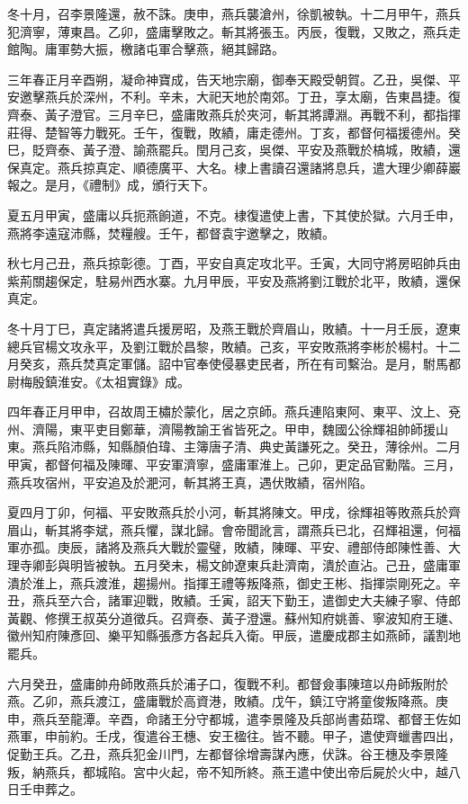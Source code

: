 \begin{pinyinscope}
冬十月，召李景隆還，赦不誅。庚申，燕兵襲滄州，徐凱被執。十二月甲午，燕兵犯濟寧，薄東昌。乙卯，盛庸擊敗之。斬其將張玉。丙辰，復戰，又敗之，燕兵走館陶。庸軍勢大振，檄諸屯軍合擊燕，絕其歸路。

三年春正月辛酉朔，凝命神寶成，告天地宗廟，御奉天殿受朝賀。乙丑，吳傑、平安邀擊燕兵於深州，不利。辛未，大祀天地於南郊。丁丑，享太廟，告東昌捷。復齊泰、黃子澄官。三月辛巳，盛庸敗燕兵於夾河，斬其將譚淵。再戰不利，都指揮莊得、楚智等力戰死。壬午，復戰，敗績，庸走德州。丁亥，都督何福援德州。癸巳，貶齊泰、黃子澄、諭燕罷兵。閏月己亥，吳傑、平安及燕戰於槁城，敗績，還保真定。燕兵掠真定、順德廣平、大名。棣上書讀召還諸將息兵，遣大理少卿薛巖報之。是月，《禮制》成，頒行天下。

夏五月甲寅，盛庸以兵扼燕餉道，不克。棣復遣使上書，下其使於獄。六月壬申，燕將李遠寇沛縣，焚糧艘。壬午，都督袁宇邀擊之，敗績。

秋七月己丑，燕兵掠彰德。丁酉，平安自真定攻北平。壬寅，大同守將房昭帥兵由紫荊關趨保定，駐易州西水寨。九月甲辰，平安及燕將劉江戰於北平，敗績，還保真定。

冬十月丁巳，真定諸將遣兵援房昭，及燕王戰於齊眉山，敗績。十一月壬辰，遼東總兵官楊文攻永平，及劉江戰於昌黎，敗績。己亥，平安敗燕將李彬於楊村。十二月癸亥，燕兵焚真定軍儲。詔中官奉使侵暴吏民者，所在有司繫治。是月，駙馬都尉梅殷鎮淮安。《太祖實錄》成。

四年春正月甲申，召故周王橚於蒙化，居之京師。燕兵連陷東阿、東平、汶上、兗州、濟陽，東平吏目鄭華，濟陽教諭王省皆死之。甲申，魏國公徐輝祖帥師援山東。燕兵陷沛縣，知縣顏伯瑋、主簿唐子清、典史黃謙死之。癸丑，薄徐州。二月甲寅，都督何福及陳暉、平安軍濟寧，盛庸軍淮上。己卯，更定品官勳階。三月，燕兵攻宿州，平安追及於淝河，斬其將王真，遇伏敗績，宿州陷。

夏四月丁卯，何福、平安敗燕兵於小河，斬其將陳文。甲戌，徐輝祖等敗燕兵於齊眉山，斬其將李斌，燕兵懼，謀北歸。會帝聞訛言，謂燕兵已北，召輝祖還，何福軍亦孤。庚辰，諸將及燕兵大戰於靈璧，敗績，陳暉、平安、禮部侍郎陳性善、大理寺卿彭與明皆被執。五月癸未，楊文帥遼東兵赴濟南，潰於直沾。己丑，盛庸軍潰於淮上，燕兵渡淮，趨揚州。指揮王禮等叛降燕，御史王彬、指揮崇剛死之。辛丑，燕兵至六合，諸軍迎戰，敗績。壬寅，詔天下勤王，遣御史大夫練子寧、侍郎黃觀、修撰王叔英分道徵兵。召齊泰、黃子澄還。蘇州知府姚善、寧波知府王璡、徽州知府陳彥回、樂平知縣張彥方各起兵入衛。甲辰，遣慶成郡主如燕師，議割地罷兵。

六月癸丑，盛庸帥舟師敗燕兵於浦子口，復戰不利。都督僉事陳瑄以舟師叛附於燕。乙卯，燕兵渡江，盛庸戰於高資港，敗績。戊午，鎮江守將童俊叛降燕。庚申，燕兵至龍潭。辛酉，命諸王分守都城，遣李景隆及兵部尚書茹瑺、都督王佐如燕軍，申前約。壬戌，復遣谷王橞、安王楹往。皆不聽。甲子，遣使齊蠟書四出，促勤王兵。乙丑，燕兵犯金川門，左都督徐增壽謀內應，伏誅。谷王橞及李景隆叛，納燕兵，都城陷。宮中火起，帝不知所終。燕王遣中使出帝后屍於火中，越八日壬申葬之。


\end{pinyinscope}
